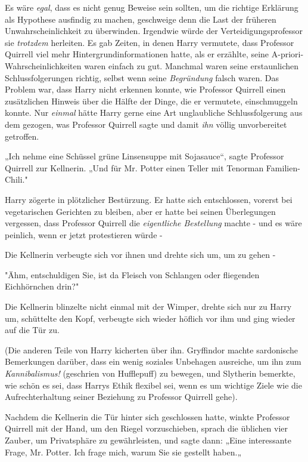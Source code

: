 {Es wäre \emph{egal}, dass es nicht genug Beweise sein sollten, um die richtige Erklärung als Hypothese ausfindig zu machen, geschweige denn die Last der früheren Unwahrscheinlichkeit zu überwinden. Irgendwie würde der Verteidigungsprofessor sie \emph{trotzdem} herleiten. Es gab Zeiten, in denen Harry vermutete, dass Professor Quirrell viel mehr Hintergrundinformationen hatte, als er erzählte, seine A-priori-Wahrscheinlichkeiten waren einfach zu gut. Manchmal waren seine erstaunlichen Schlussfolgerungen richtig, selbst wenn seine \emph{Begründung} falsch waren. Das Problem war, dass Harry nicht erkennen konnte, wie Professor Quirrell einen zusätzlichen Hinweis über die Hälfte der Dinge, die er vermutete, einschmuggeln konnte. Nur \emph{einmal} hätte Harry gerne eine Art unglaubliche Schlussfolgerung aus dem gezogen, was Professor Quirrell sagte und damit \emph{ihn} völlig unvorbereitet getroffen.

„Ich nehme eine Schüssel grüne Linsensuppe mit Sojasauce“, sagte Professor Quirrell zur Kellnerin. „Und für Mr. Potter einen Teller mit Tenorman Familien-Chili."

Harry zögerte in plötzlicher Bestürzung. Er hatte sich entschlossen, vorerst bei vegetarischen Gerichten zu bleiben, aber er hatte bei seinen Überlegungen vergessen, dass Professor Quirrell die \emph{eigentliche Bestellung} machte - und es wäre peinlich, wenn er jetzt protestieren würde -

Die Kellnerin verbeugte sich vor ihnen und drehte sich um, um zu gehen -

"Ähm, entschuldigen Sie, ist da Fleisch von Schlangen oder fliegenden Eichhörnchen drin?"

Die Kellnerin blinzelte nicht einmal mit der Wimper, drehte sich nur zu Harry um, schüttelte den Kopf, verbeugte sich wieder höflich vor ihm und ging wieder auf die Tür zu.

(Die anderen Teile von Harry kicherten über ihn. Gryffindor machte sardonische Bemerkungen darüber, dass ein wenig soziales Unbehagen ausreiche, um ihn zum \emph{Kannibalismus!} (geschrien von Hufflepuff) zu bewegen, und Slytherin bemerkte, wie schön es sei, dass Harrys Ethik flexibel sei, wenn es um wichtige Ziele wie die Aufrechterhaltung seiner Beziehung zu Professor Quirrell gehe).

Nachdem die Kellnerin die Tür hinter sich geschlossen hatte, winkte Professor Quirrell mit der Hand, um den Riegel vorzuschieben, sprach die üblichen vier Zauber, um Privatsphäre zu gewährleisten, und sagte dann: „Eine interessante Frage, Mr. Potter. Ich frage mich, warum Sie sie gestellt haben.„

}
